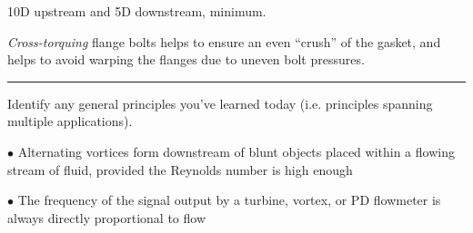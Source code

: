 \vskip 10pt

10D upstream and 5D downstream, minimum.

\vskip 10pt

{\it Cross-torquing} flange bolts helps to ensure an even ``crush'' of the gasket, and helps to avoid warping the flanges due to uneven bolt pressures.


\filbreak \vskip 5pt \hrule \vskip 5pt  \vskip 10pt

\noindent
Identify any general principles you've learned today (i.e. principles spanning multiple applications).
\item{$\bullet$} Alternating vortices form downstream of blunt objects placed within a flowing stream of fluid, provided the Reynolds number is high enough
\item{$\bullet$} The frequency of the signal output by a turbine, vortex, or PD flowmeter is always directly proportional to flow
\medskip


